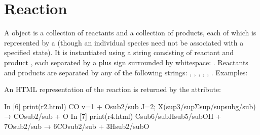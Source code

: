 \documentclass[letterpaper,10pt,english]{sphinxmanual}
\begin{document}
\chapter{Reaction}
\label{\detokenize{reaction:reaction}}\label{\detokenize{reaction::doc}}
A  object is a collection of reactants and a collection of products, each of which is represented by a  (though an individual species need not be associated with a specified state). It is instantiated using a string consisting of reactant and product , each separated by a plus sign surrounded by whitespace: . Reactants and products are separated by any of the following strings: , , , , , . Examples:

\begin{sphinxVerbatim}[commandchars=\\\{\}]
 \PYG{p}{[}\PYG{p}{]}    
 \PYG{p}{[}\PYG{p}{]}   
 \PYG{p}{[}\PYG{p}{]}   
 \PYG{p}{[}\PYG{p}{]}   
 \PYG{p}{[}\PYG{p}{]}   
\end{sphinxVerbatim}

An HTML representation of the reaction is returned by the  attribute:

\begin{sphinxVerbatim}[commandchars=\\\{\}]
In [6] print(r2.html)
CO v=1 + O\PYGZlt{}sub\PYGZgt{}2\PYGZlt{}/sub\PYGZgt{} J=2; X(\PYGZlt{}sup\PYGZgt{}3\PYGZlt{}/sup\PYGZgt{}Σ\PYGZlt{}sup\PYGZgt{}\PYGZhy{}\PYGZlt{}/sup\PYGZgt{}\PYGZlt{}sub\PYGZgt{}g\PYGZlt{}/sub\PYGZgt{}) → CO\PYGZlt{}sub\PYGZgt{}2\PYGZlt{}/sub\PYGZgt{} + O
In [7] print(r4.html)
C\PYGZlt{}sub\PYGZgt{}6\PYGZlt{}/sub\PYGZgt{}H\PYGZlt{}sub\PYGZgt{}5\PYGZlt{}/sub\PYGZgt{}OH + 7O\PYGZlt{}sub\PYGZgt{}2\PYGZlt{}/sub\PYGZgt{} → 6CO\PYGZlt{}sub\PYGZgt{}2\PYGZlt{}/sub\PYGZgt{} + 3H\PYGZlt{}sub\PYGZgt{}2\PYGZlt{}/sub\PYGZgt{}O
\end{sphinxVerbatim}
\end{document}
